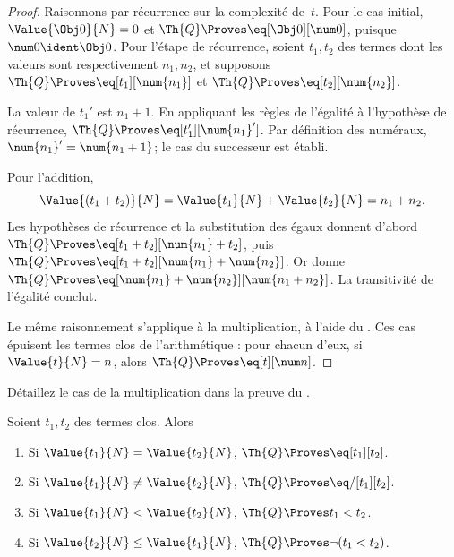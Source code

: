 \documentclass[../../../include/open-logic-section]{subfiles}
\begin{document}
\begin{proof}
Raisonnons par récurrence sur la complexité de~$t$.
Pour le cas initial, $\Value{\Obj 0}{N}=0$ et
$\Th{Q}\Proves\eq[\Obj 0][\num 0]$, puisque
$\num 0\ident\Obj 0$.
%
Pour l'étape de récurrence, soient $t_1,t_2$ des termes
dont les valeurs sont respectivement $n_1,n_2$, et
supposons
$\Th{Q}\Proves\eq[t_1][\num{n_1}]$ et
$\Th{Q}\Proves\eq[t_2][\num{n_2}]$.

La valeur de $t_1'$ est $n_1+1$. En appliquant les règles
de l'égalité à l'hypothèse de récurrence,
$\Th{Q}\Proves\eq[t_1'][{\num{n_1}}']$.
Par définition des numéraux,
$\num{n_1}'=\num{n_1+1}$; le cas du successeur est établi.

Pour l'addition,
\[
      \Value{(t_1 + t_2)}{N}
    = \Value{t_1}{N} + \Value{t_2}{N}
    = n_1 + n_2.
\]
Les hypothèses de récurrence et la substitution des égaux
donnent d'abord
$\Th{Q}\Proves\eq[t_1+t_2][\num{n_1}+t_2]$,
puis
$\Th{Q}\Proves\eq[t_1+t_2][\num{n_1}+\num{n_2}]$.
Or  donne
$\Th{Q}\Proves
\eq[\num{n_1}+\num{n_2}][\num{n_1+n_2}]$.
La transitivité de l'égalité conclut.

Le même raisonnement s'applique à la multiplication, à
l'aide du .
%
Ces cas épuisent les termes clos de l'arithmétique :
pour chacun d'eux, si $\Value{t}{N}=n$, alors
$\Th{Q}\Proves\eq[t][\num n]$.
\end{proof}

\begin{prob}
Détaillez le cas de la multiplication dans la preuve du
.
\end{prob}

\begin{lem}
Soient $t_1,t_2$ des termes clos. Alors
\begin{enumerate}
\item Si $\Value{t_1}{N}=\Value{t_2}{N}$,
      $\Th{Q}\Proves\eq[t_1][t_2]$.
\item Si $\Value{t_1}{N}\neq\Value{t_2}{N}$,
      $\Th{Q}\Proves\eq/[t_1][t_2]$.
\item Si $\Value{t_1}{N}<\Value{t_2}{N}$,
      $\Th{Q}\Proves t_1<t_2$.
\item Si $\Value{t_2}{N}\leq\Value{t_1}{N}$,
      $\Th{Q}\Proves\lnot(t_1<t_2)$.
\end{enumerate}
\end{lem}
\end{document}
